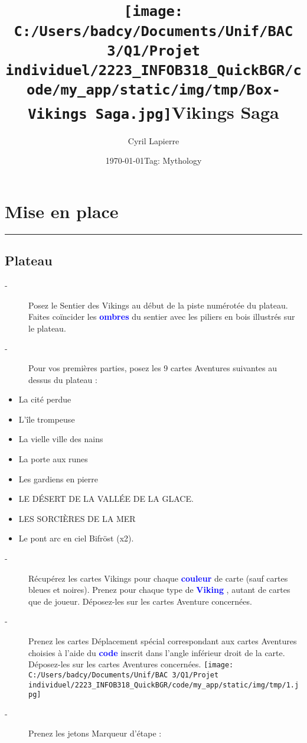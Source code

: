 \documentclass{scrartcl}%
\title{\texttt{[image: C:/Users/badcy/Documents/Unif/BAC 3/Q1/Projet individuel/2223\_INFOB318\_QuickBGR/code/my\_app/static/img/tmp/Box-Vikings Saga.jpg]}\break Vikings Saga }%
\author{Cyril Lapierre}%
\date{\today \break Tag: Mythology}%
\begin{document}
%
\normalsize%
\maketitle\thispagestyle{header}%
\pagestyle{header}%
\sectionfont{\color{blue}}%
\subsectionfont{\color{blue}}%
\subsubsectionfont{\color{blue}}%
\section{ Mise en place
}%
\label{sec:Miseenplace}%
\textcolor{blue}{\rule{18cm}{0.07cm}}\break

%
\subsection{ Plateau
}%
\label{subsec:Plateau}%
\begin{description}%
\item[{-} ]%
%
 Posez le Sentier des Vikings au début de la piste numérotée du plateau. Faites coïncider les %
\textcolor{blue}{%
\textbf{ombres}%
}%
\textit{ }%
 du sentier avec les piliers en bois illustrés sur le plateau.
%
\item[{-} ]%
%
 Pour vos premières parties, posez les 9 cartes Aventures suivantes au dessus du plateau :
%
\end{description}%
\begin{itemize}%
\item%
%
 La cité perdue 
%
\item%
%
 L’île trompeuse 
%
\item%
%
 La vielle ville des nains 
%
\item%
%
 La porte aux runes 
%
\item%
%
 Les gardiens en pierre 
%
\item%
%
 LE DÉSERT DE LA VALLÉE DE LA GLACE.
%
\item%
%
 LES SORCIÈRES DE LA MER 
%
\item%
%
 Le pont arc en ciel Bifröst (x2).
%
\end{itemize}%
\begin{description}%
\item[{-} ]%
%
 Récupérez les cartes Vikings pour chaque %
\textcolor{blue}{%
\textbf{couleur}%
}%
\textit{ }%
 de carte (sauf cartes bleues et noires). Prenez pour chaque type de %
\textcolor{blue}{%
\textbf{Viking}%
}%
, autant de cartes que de joueur. Déposez{-}les sur les cartes Aventure concernées.
%
\item[{-} ]%
%
 Prenez les cartes Déplacement spécial correspondant aux cartes Aventures choisies à l'aide du %
\textcolor{blue}{%
\textbf{code}%
}%
\textit{ }%
 inscrit dans l'angle inférieur droit de la carte. Déposez{-}les sur les cartes Aventures concernées.%
\texttt{[image: C:/Users/badcy/Documents/Unif/BAC 3/Q1/Projet individuel/2223\_INFOB318\_QuickBGR/code/my\_app/static/img/tmp/1.jpg]}%

%
\item[{-} ]%
%
 Prenez les jetons Marqueur d'étape :
%
\end{description}%
\end{document}
